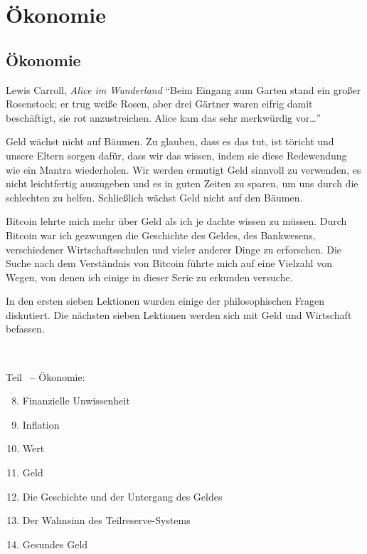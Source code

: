 \part{Ökonomie}
\label{ch:economics}
\chapter*{Ökonomie}

\begin{chapquote}{Lewis Carroll, \textit{Alice im Wunderland}}
\enquote{Beim Eingang zum Garten stand ein großer Rosenstock; er trug weiße
Rosen, aber drei Gärtner waren eifrig damit beschäftigt, sie rot anzustreichen.
Alice kam das sehr merkwürdig vor\ldots}
\end{chapquote}

Geld wächst nicht auf Bäumen. Zu glauben, dass es das tut, ist töricht und
unsere Eltern sorgen dafür, dass wir das wissen, indem sie diese Redewendung wie
ein Mantra wiederholen. Wir werden ermutigt Geld sinnvoll zu verwenden, es nicht
leichtfertig auszugeben und es in guten Zeiten zu sparen, um uns durch die
schlechten zu helfen. Schließlich wächst Geld nicht auf den Bäumen.

Bitcoin lehrte mich mehr über Geld als ich je dachte wissen zu müssen. Durch
Bitcoin war ich gezwungen die Geschichte des Geldes, des Bankwesens,
verschiedener Wirtschaftsschulen und vieler anderer Dinge zu erforschen. Die
Suche nach dem Verständnis von Bitcoin führte mich auf eine Vielzahl von Wegen,
von denen ich einige in dieser Serie zu erkunden versuche.

In den ersten sieben Lektionen wurden einige der philosophischen Fragen
diskutiert. Die nächsten sieben Lektionen werden sich mit Geld und Wirtschaft
befassen.

~

\begin{samepage}
Teil~\ref{ch:economics} -- Ökonomie:

\begin{enumerate}
  \setcounter{enumi}{7}
  \item Finanzielle Unwissenheit
  \item Inflation
  \item Wert
  \item Geld
  \item Die Geschichte und der Untergang des Geldes
  \item Der Wahnsinn des Teilreserve-Systems
  \item Gesundes Geld
\end{enumerate}
\end{samepage}

